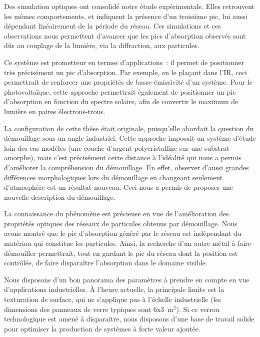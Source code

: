 Des simulation optiques ont consolidé notre étude expérimentale. Elles retrouvent les mêmes comportements, et indiquent la présence d'un troisième pic, lui aussi dépendant linéairement de la période du réseau. Ces simulations et ces observations nous permettent d'avancer que les pics d'absorption observés sont dûs au couplage de la lumière, via la diffraction, aux particules.\par 
Ce système est prometteur en termes d'applications~: il permet de positionner très précisément un pic d'absorption. Par exemple, en le plaçant dans l'IR, ceci permettrait de renforcer une propriétés de basse-émissivité d'un système. Pour le photovoltaïque, cette approche permettrait également de positionner un pic d'absorption en fonction du spectre solaire, afin de convertir le maximum de lumière en paires électrons-trous.\par 
\vspace{12pt}
La configuration de cette thèse était originale, puisqu'elle abordait la question du démouillage sous un angle industriel. Cette approche imposait un système d'étude loin des cas modèles (une couche d'argent polycristalline sur une substrat amorphe), mais c'est précisément cette distance à l'idéalité qui nous a permis d'améliorer la compréhension du démouillage. En effet, observer d'aussi grandes différences morphologiques lors du démouillage en changeant seulement d'atmosphère est un résultat nouveau. Ceci nous a permis de proposer une nouvelle description du démouillage.\par 
La connaissance du phénomène est précieuse en vue de l'amélioration des propriétés optiques des réseaux de particules obtenus par démouillage. Nous avons montré que le pic d'absorption généré par le réseau est indépendant du matériau qui constitue les particules. Ainsi, la recherche d'un autre métal à faire démouiller permettrait, tout en gardant le pic du réseau dont la position est contrôlée, de faire disparaître l'absorption dans le domaine visible.\par 
Nous disposons d'un bon panorama des paramètres à prendre en compte en vue d'applications industrielles. À l'heure actuelle, la principale limite est la texturation de surface, qui ne s'applique pas à l'échelle industrielle (les dimensions des panneaux de verre typiques sont 6x3~m$^2$). Si ce verrou technologique est amené à disparaitre, nous disposons d'une base de travail solide pour optimiser la production de systèmes à forte valeur ajoutée.\par 

